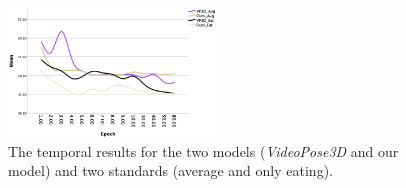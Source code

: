 \documentclass[10pt,twocolumn,letterpaper]{article}
\begin{document}
\begin{figure}
    \centering
    \includegraphics[width=0.49\textwidth]{MPJPE_epoch.png}
	\caption{The temporal results for the two models (\textit{VideoPose3D} and our model) and two standards (average and only eating).}
	\label{fig:temporal_figure}
\end{figure}




\clearpage

{\small


}
\end{document}
